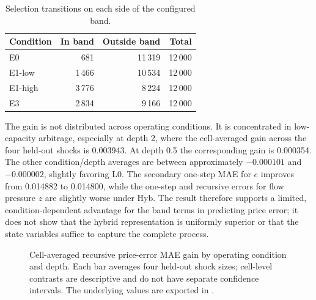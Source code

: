 \begin{table}[htbp]
\centering
\caption{Selection transitions on each side of the configured band.}
\label{tab:hybrid-regimes}
\small
\begin{tabular}{@{}lrrr@{}}
\toprule
Condition & In band & Outside band & Total \\
\midrule
E0 & 681 & 11\,319 & 12\,000 \\
E1-low & 1\,466 & 10\,534 & 12\,000 \\
E1-high & 3\,776 & 8\,224 & 12\,000 \\
E3 & 2\,834 & 9\,166 & 12\,000 \\
\bottomrule
\end{tabular}
\end{table}

The gain is not distributed across operating conditions. It is concentrated in low-capacity arbitrage, especially at depth 2, where the cell-averaged gain across the four held-out shocks is 0.003943. At depth 0.5 the corresponding gain is 0.000354. The other condition/depth averages are between approximately $-0.000101$ and $-0.000002$, slightly favoring L0. The secondary one-step MAE for $e$ improves from 0.014882 to 0.014800, while the one-step and recursive errors for flow pressure $z$ are slightly worse under Hyb. The result therefore supports a limited, condition-dependent advantage for the band terms in predicting price error; it does not show that the hybrid representation is uniformly superior or that the state variables suffice to capture the complete process.

\begin{figure}[H]
\centering
{}
\caption{Cell-averaged recursive price-error MAE gain by operating condition and depth. Each bar averages four held-out shock sizes; cell-level contrasts are descriptive and do not have separate confidence intervals. The underlying values are exported in .}
\label{fig:hybrid-cell-gains}
\end{figure}

